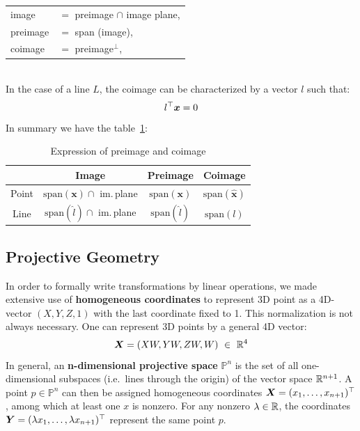 \begin{tabular}{ll}
	image &$=$ preimage $\cap$ image plane,\\
	preimage &$=$ span (image),\\
	coimage &$=$ preimage$^{\bot}$,\\
\end{tabular}\\[1em]

In the case of a line $L$, the coimage can be characterized by
a vector $l$ such that:
\[
	l^{\top} \bm{x} = 0
\]
In summary we have the table~\ref{tab:expression_preimage_coimage}:

\begin{table}[h]
\small
\begin{tabular}{cccc}
	& Image & Preimage & Coimage \\ \midrule
	Point
		& $\text{span}(\bm{x}) \cap$ im.\,plane
		& $\text{span}(\bm{x})$
		& $\text{span}(\bm{\widehat{x}})$ \\
	Line
		& $\text{span}(\widehat{l}) \cap$ im.\,plane
		& $\text{span}(\widehat{l})$
		& $\text{span}(l)$ \\
\end{tabular}
\caption{Expression of preimage and coimage}%
\label{tab:expression_preimage_coimage}
\end{table}



\subsection{Projective Geometry}%
\label{sub:projective_geometry}


In order to formally write transformations by linear operations,
we made extensive use of \textbf{homogeneous coordinates} to represent
3D point as a 4D-vector $(X,Y,Z,1)$ with the last coordinate fixed to 1.
This normalization is not always necessary. One can represent 3D points
by a general 4D vector:
\[
	\bm{X} = (XW, YW, ZW, W)\ \in\ \mathbb{R}^4
\]
In general, an \textbf{n-dimensional projective space} $\mathbb{P}^n$
is the set of all one-dimensional subspaces (i.e.\ lines through the origin)
of the vector space $\mathbb{R}^{n+1}$.
A point $p \in \mathbb{P}^n$ can then be assigned homogeneous coordinates
$\bm{X} = (x_1, \ldots, x_{n+1})^{\top}$, among which at least one $x$ is nonzero.
For any nonzero $\lambda \in \mathbb{R}$, the coordinates
$\bm{Y} = (\lambda x_1, \ldots, \lambda x_{n+1})^{\top}$
represent the same point $p$.
